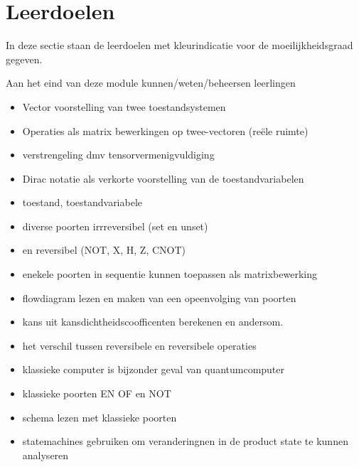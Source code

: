 \documentclass[../main.tex]{subfiles}
\begin{document}
\section*{Leerdoelen}

In deze sectie staan de leerdoelen met kleurindicatie voor de moeilijkheidsgraad gegeven.

Aan het eind van deze module kunnen/weten/beheersen leerlingen
\begin{itemize}
\item Vector voorstelling van twee toestandsystemen
\item Operaties als matrix bewerkingen op twee-vectoren (re\"ele ruimte)
\item verstrengeling dmv tensorvermenigvuldiging
\item Dirac notatie als verkorte voorstelling van de toestandvariabelen 
\item toestand, toestandvariabele 
\item diverse poorten irrreversibel (set en unset)
\item  en reversibel (NOT, X, H, Z, CNOT)
\item enekele poorten in sequentie kunnen toepassen als matrixbewerking
\item flowdiagram lezen en maken van een opeenvolging van poorten
 \item kans uit kansdichtheidscoofficenten berekenen en andersom.
\item het verschil tussen reversibele en reversibele operaties
\item klassieke computer is bijzonder geval van quantumcomputer
\item klassieke poorten EN OF en NOT
\item schema lezen met klassieke poorten
\item statemachines gebruiken om veranderingnen in de product state te kunnen analyseren
\end{itemize}
\end{document}
